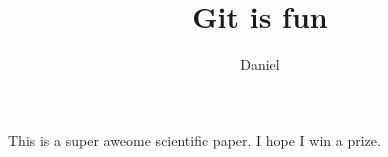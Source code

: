 \documentclass[10pt]{article}
\author{Daniel}
\title{Git is fun}
\begin{document}
	\maketitle
	
	This is a super aweome scientific paper. 
	I hope I win a prize.
\end{document}
